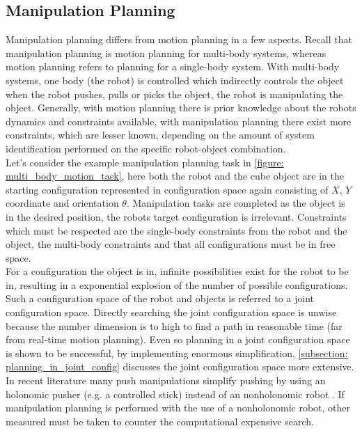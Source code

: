 \subsection{Manipulation Planning}
\label{subsection: manipulation_planning}
Manipulation planning differs from motion planning in a few aspects. Recall that manipulation planning is motion planning for multi-body systems, whereas motion planning refers to planning for a single-body system. With multi-body systems, one body (the robot) is controlled which indirectly controls the object when the robot pushes, pulls or picks the object, the robot is manipulating the object. Generally, with motion planning there is prior knowledge about the robots dynamics and constraints available, with manipulation planning there exist more constraints, which are lesser known, depending on the amount of system identification performed on the specific robot-object combination. \\

Let's consider the example manipulation planning task in \cref{figure: multi_body_motion_task}, here both the robot and the cube object are in the starting configuration represented in configuration space again consisting of $X$, $Y$ coordinate and orientation $\theta$. Manipulation tasks are completed as the object is in the desired position, the robots target configuration is irrelevant. Constraints which must be respected are the single-body constraints from the robot and the object, the multi-body constraints and that all configurations must be in free space. \\

For a configuration the object is in, infinite possibilities exist for the robot to be in, resulting in a exponential explosion of the number of possible configurations. Such a configuration space of the robot and objects is referred to a joint configuration space. Directly searching the joint configuration space is unwise because the number dimension is to high to find a path in reasonable time (far from real-time motion planning). Even so planning in a joint configuration space is shown to be successful, by implementing enormous simplification, \cref{subsection: planning_in_joint_config} discusses the joint configuration space more extensive.\\

In recent literature many push manipulations simplify pushing by using an holonomic pusher (e.g. a controlled stick) instead of an nonholonomic robot \cite{bauza_data-efficient_2018,kopicki_learning_2017,cong_self-adapting_2020,arruda_uncertainty_2017}. If manipulation planning is performed with the use of a nonholonomic robot, other measured must be taken to counter the computational expensive search. \\

